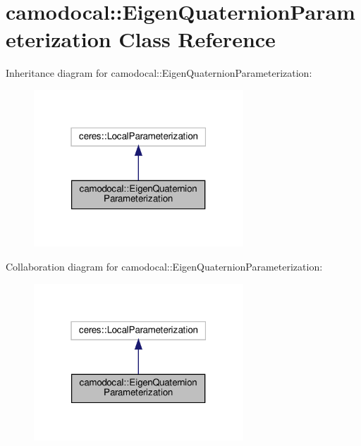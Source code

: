 \hypertarget{classcamodocal_1_1EigenQuaternionParameterization}{}\section{camodocal\+:\+:Eigen\+Quaternion\+Parameterization Class Reference}
\label{classcamodocal_1_1EigenQuaternionParameterization}


Inheritance diagram for camodocal\+:\+:Eigen\+Quaternion\+Parameterization\+:\nopagebreak
\begin{figure}[H]
\begin{center}
\leavevmode
\includegraphics[width=223pt]{classcamodocal_1_1EigenQuaternionParameterization__inherit__graph}
\end{center}
\end{figure}


Collaboration diagram for camodocal\+:\+:Eigen\+Quaternion\+Parameterization\+:\nopagebreak
\begin{figure}[H]
\begin{center}
\leavevmode
\includegraphics[width=223pt]{classcamodocal_1_1EigenQuaternionParameterization__coll__graph}
\end{center}
\end{figure}
